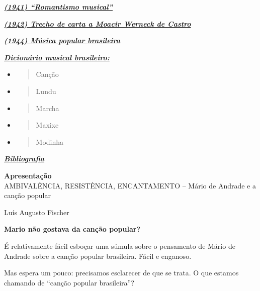 \protect\hyperlink{xujf5md356km}{\textbf{\emph{(1941) ``Romantismo
musical''}}}

\protect\hyperlink{u8wv98red8za}{\textbf{\emph{(1942) Trecho de carta a
Moacir Werneck de Castro}}}

\protect\hyperlink{9zxg5tyqyodq}{\textbf{\emph{(1944) Música popular
brasileira}}}

\protect\hyperlink{i4e6bfltmjum}{\textbf{\emph{Dicionário musical
brasileiro:}}}

\begin{itemize}
\item
  \begin{quote}
  Canção
  \end{quote}
\item
  \begin{quote}
  Lundu
  \end{quote}
\item
  \begin{quote}
  Marcha
  \end{quote}
\item
  \begin{quote}
  Maxixe
  \end{quote}
\item
  \begin{quote}
  Modinha
  \end{quote}
\end{itemize}

\protect\hyperlink{rh4wcglpqya4}{\textbf{\emph{Bibliografia}}}

\textbf{Apresentação}\\[3\baselineskip]AMBIVALÊNCIA, RESISTÊNCIA,
ENCANTAMENTO -- Mário de Andrade e a canção popular

Luís Augusto Fischer

\textbf{Mario não gostava da canção popular?}

É relativamente fácil esboçar uma súmula sobre o pensamento de Mário de
Andrade sobre a canção popular brasileira. Fácil e enganoso.

Mas espera um pouco: precisamos esclarecer de que se trata. O que
estamos chamando de ``canção popular brasileira''?

